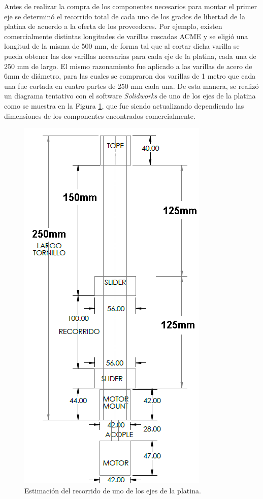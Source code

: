 Antes de realizar la compra de los componentes necesarios para montar el primer eje se determinó el recorrido total de cada uno de los grados de libertad de la platina de acuerdo a la oferta de los proveedores. Por ejemplo, existen comercialmente distintas longitudes de varillas roscadas ACME y se eligió una longitud de la misma de 500 mm, de forma tal que al cortar dicha varilla se pueda obtener las dos varillas necesarias para cada eje de la platina, cada una de 250 mm de largo. El mismo razonamiento fue aplicado a las varillas de acero de 6mm de diámetro, para las cuales se compraron dos varillas de 1 metro que cada una fue cortada en cuatro partes de 250 mm cada una. De esta manera, se realizó un diagrama tentativo con el software \textit{Solidworks} de uno de los ejes de la platina como se muestra en la Figura \ref{fig:dimejee}, que fue siendo actualizando dependiendo las dimensiones de los componentes encontrados comercialmente.

\begin{figure}[H]
	\centering
	\includegraphics[scale=1.0]{Figs/microespectrometro/dimensio.png}
	\caption{Estimación del recorrido de uno de los ejes de la platina.}
	\label{fig:dimejee}
\end{figure}

